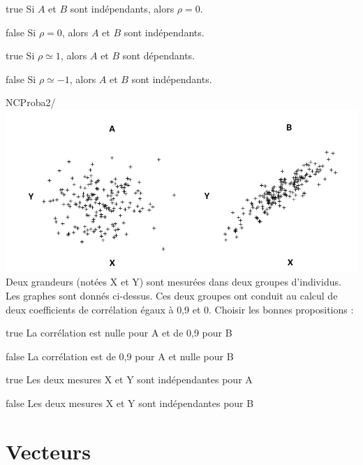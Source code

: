 \documentclass[11pt]{article}
\begin{document}
            \begin{reponses}
            	\item[true]  Si $A$ et $B$ sont indépendants, alors $\rho =0 $.
            	\item[false] Si $\rho =0 $, alors $A$ et $B$ sont indépendants.
                \item[true]  Si $\rho \simeq 1 $, alors $A$ et $B$ sont dépendants.
                \item[false] Si $\rho \simeq -1 $, alors $A$ et $B$ sont indépendants.
            \end{reponses}
			
			
			\begin{question}{NC}{Proba}{2}{/} 
            \includegraphics[width=\textwidth]{Christopher/Figures_Christopher/correlation_UE.png}
 				Deux grandeurs (notées X et Y) sont mesurées dans deux groupes d’individus. Les graphes sont donnés ci-dessus. Ces deux groupes ont conduit au calcul de deux coefficients de corrélation égaux à 0,9 et 0. Choisir les bonnes propositions : 

            \end{question}

            \begin{reponses}
            	\item[true]  La corrélation est nulle pour A et de 0,9 pour B
            	\item[false] La corrélation est de 0,9 pour A et nulle pour B
                \item[true]  Les deux mesures X et Y sont indépendantes pour A
                \item[false] Les deux mesures X et Y sont indépendantes pour B
            \end{reponses}


    \section{Vecteurs}
\end{document}
